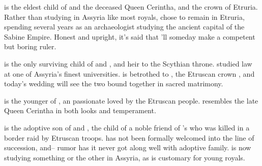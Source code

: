 \documentclass[blue]{Kos}
\begin{document}
\cGroom{} is the eldest child of \cEtruriaKing{\Monarch} \cEtruriaKing{} and the deceased Queen Cerintha, and the crown \cGroom{\prince} of Etruria. Rather than studying in Assyria like most royals, \cGroom{\they} chose to remain in Etruria, spending several years as an archaeologist studying the ancient capital of the Sabine Empire. Honest and upright, it's said that \cGroom{\they}'ll someday make a competent but boring ruler.

\cBride{} is the only surviving child of \cScythiaKing{} and \cScythiaQueen{}, and heir to the Scythian throne. \cBride{\They} studied law at one of Assyria's finest universities. \cBride{\They} is betrothed to \cGroom{}, the Etruscan crown \cGroom{\prince}, and today's wedding will see the two bound together in sacred matrimony. 

\cPoet{} is the younger \cPoet{\sibling} of \cGroom{\Prince} \cGroom{}, an passionate \cPoet{\prince} loved by the Etruscan people. \cPoet{\They} resembles the late Queen Cerintha in both looks and temperament.

\cWard{} is the adoptive son of \cScythiaKing{} and \cScythiaQueen{}, the child of a noble friend of \cScythiaQueen{}'s who was killed in a border raid by Etruscan troops. \cWard{\They} has not been formally welcomed into the line of succession, and– rumor has it \cWard{\they} never got along well with \cWard{\their} adoptive family. \cWard{\They} is now studying something or the other in Assyria, as is customary for young royals.
\end{document}
